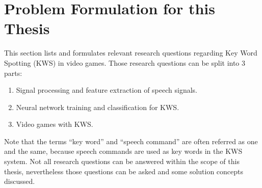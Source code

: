 
\section{Problem Formulation for this Thesis}\label{sec:intro_rq}
\thesisStateRevised
This section lists and formulates relevant research questions regarding Key Word Spotting (KWS) in video games.
Those research questions can be split into 3 parts:
\begin{enumerate}[label={Q.\arabic*)}, leftmargin=1.4cm]
    \item Signal processing and feature extraction of speech signals.
    \item Neural network training and classification for KWS.
    \item Video games with KWS.
\end{enumerate}
Note that the terms \enquote{key word} and \enquote{speech command} are often referred as one and the same, because speech commands are used as key words in the KWS system.
Not all research questions can be answered within the scope of this thesis, nevertheless those questions can be asked and some solution concepts discussed.



